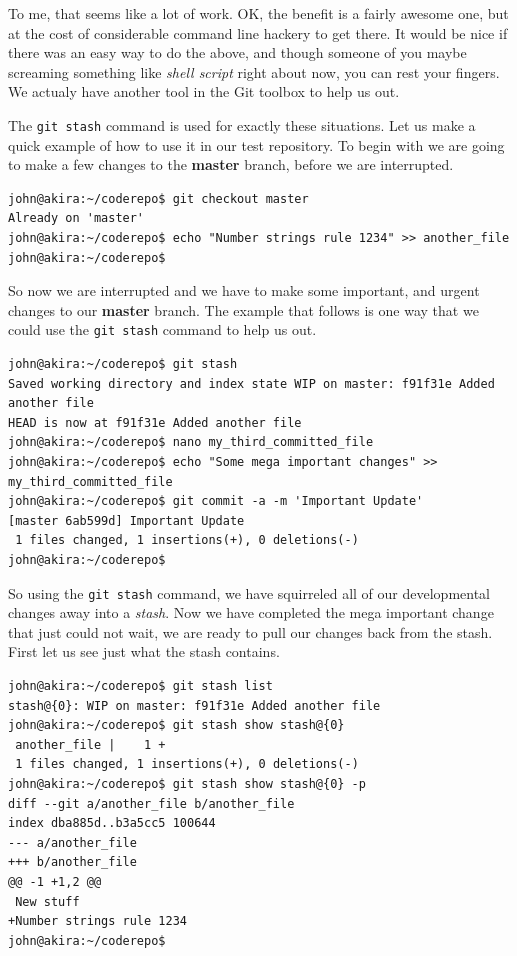 To me, that seems like a lot of work.  OK, the benefit is a fairly awesome one, but at the cost of considerable command line hackery to get there.  It would be nice if there was an easy way to do the above, and though someone of you maybe screaming something like \emph{shell script} right about now, you can rest your fingers.  We actualy have another tool in the Git toolbox to help us out.

The \texttt{git stash} command is used for exactly these situations.  Let us make a quick example of how to use it in our test repository.  To begin with we are going to make a few changes to the \textbf{master} branch, before we are interrupted.

\begin{Verbatim}[frame=leftline,framerule=1mm,fontsize=\relsize{-3}] 
john@akira:~/coderepo$ git checkout master
Already on 'master'
john@akira:~/coderepo$ echo "Number strings rule 1234" >> another_file 
john@akira:~/coderepo$ 
\end{Verbatim}

So now we are interrupted and we have to make some important, and urgent changes to our \textbf{master} branch.  The example that follows is one way that we could use the \texttt{git stash} command to help us out.  

\begin{Verbatim}[frame=leftline,framerule=1mm,fontsize=\relsize{-3}] 
john@akira:~/coderepo$ git stash
Saved working directory and index state WIP on master: f91f31e Added another file
HEAD is now at f91f31e Added another file
john@akira:~/coderepo$ nano my_third_committed_file 
john@akira:~/coderepo$ echo "Some mega important changes" >> my_third_committed_file 
john@akira:~/coderepo$ git commit -a -m 'Important Update'
[master 6ab599d] Important Update
 1 files changed, 1 insertions(+), 0 deletions(-)
john@akira:~/coderepo$ 
\end{Verbatim}

So using the \texttt{git stash} command, we have squirreled all of our developmental changes away into a \emph{stash}.  Now we have completed the mega important change that just could not wait, we are ready to pull our changes back from the stash.  First let us see just what the stash contains.

\begin{Verbatim}[frame=leftline,framerule=1mm,fontsize=\relsize{-3}] 
john@akira:~/coderepo$ git stash list
stash@{0}: WIP on master: f91f31e Added another file
john@akira:~/coderepo$ git stash show stash@{0}
 another_file |    1 +
 1 files changed, 1 insertions(+), 0 deletions(-)
john@akira:~/coderepo$ git stash show stash@{0} -p
diff --git a/another_file b/another_file
index dba885d..b3a5cc5 100644
--- a/another_file
+++ b/another_file
@@ -1 +1,2 @@
 New stuff
+Number strings rule 1234
john@akira:~/coderepo$ 
\end{Verbatim}

